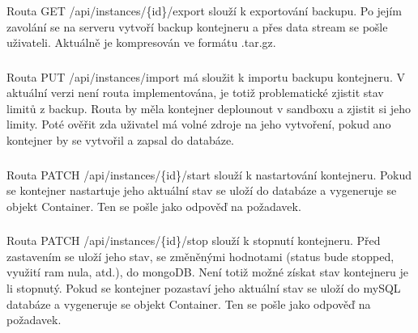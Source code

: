 \documentclass[a4paper,oneside,12pt]{report}
\begin{document}
\subsubsection{}

Routa GET /api/instances/\{id\}/export slouží k exportování backupu.
Po jejím zavolání se na serveru vytvoří backup kontejneru a přes data stream se pošle uživateli.
Aktuálně je kompresován ve formátu .tar.gz.

\subsubsection{\color{apiyellow}{PUT -- /api/instances/import}}

Routa PUT /api/instances/import má sloužit k importu backupu kontejneru.
V aktuální verzi není routa implementována, je totiž problematické zjistit stav limitů z backup.
Routa by měla kontejner deplounout v sandboxu a zjistit si jeho limity.
Poté ověřit zda uživatel má volné zdroje na jeho vytvoření, pokud ano kontejner by se vytvořil a zapsal do databáze.


\subsubsection{}

Routa PATCH  /api/instances/\{id\}/start slouží k nastartování kontejneru.
Pokud se kontejner nastartuje jeho aktuální stav se uloží do databáze a vygeneruje se objekt Container.
Ten se pošle jako odpověď na požadavek.

\subsubsection{}

Routa PATCH  /api/instances/\{id\}/stop slouží k stopnutí kontejneru.
Před zastavením se uloží jeho stav, se změněnými hodnotami (status bude stopped, využití ram nula, atd.), do mongoDB.
Není totiž možné získat stav kontejneru je li stopnutý.
Pokud se kontejner pozastaví jeho aktuální stav se uloží do mySQL databáze a vygeneruje se objekt Container.
Ten se pošle jako odpověď na požadavek.


\subsubsection{}
\end{document}
